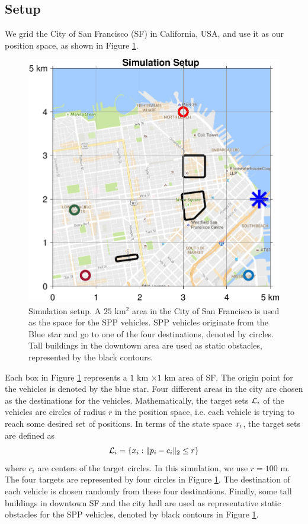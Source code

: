 \subsection{Setup \label{sec:city_simSetup}}
We grid the City of San Francisco (SF) in California, USA, and use it as our position space, as shown in Figure \ref{fig:sf_setup}. 
\begin{figure}[H]
  \centering
  \includegraphics[width=\columnwidth]{figs/sf_setup}
  \caption{Simulation setup. A $25$ km$^2$ area in the City of San Francisco is used as the space for the SPP vehicles. SPP vehicles originate from the Blue star and go to one of the four destinations, denoted by circles. Tall buildings in the downtown area are used as static obstacles, represented by the black contours.}
  \label{fig:sf_setup}
\end{figure}
Each box in Figure \ref{fig:sf_setup} represents a $1$ km $\times 1$ km area of SF. The origin point for the vehicles is denoted by the blue star. Four different areas in the city are chosen as the destinations for the vehicles. Mathematically, the target sets $\mathcal{L}_i$ of the vehicles are circles of radius $r$ in the position space, i.e. each vehicle is trying to reach some desired set of positions. In terms of the state space $x_i$, the target sets are defined as
\begin{equation}
\label{eq:target_sim}
\mathcal{L}_i = \{x_i: \|p_i - c_i\|_2 \le r\}
\end{equation}
\noindent where $c_i$ are centers of the target circles. In this simulation, we use $r = 100$ m. The four targets are represented by four circles in Figure \ref{fig:sf_setup}. The destination of each vehicle is chosen randomly from these four destinations. Finally, some tall buildings in downtown SF and the city hall are used as representative static obstacles for the SPP vehicles, denoted by black contours in Figure \ref{fig:sf_setup}.

